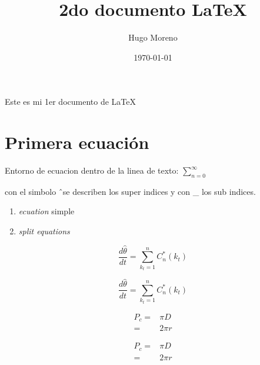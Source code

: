 \documentclass{article}
\title{2do documento \LaTeX}
\author{Hugo Moreno}
\begin{document}
\date{\today}
\maketitle

Este es mi 1er documento de \LaTeX

\section{Primera ecuaci\'on}

Entorno de ecuacion dentro de la linea de texto: $\sum^{\infty}_{n=0}$

con el simbolo \^\  se describen los super indices y con \_ los sub indices.

\begin{enumerate}
\item \emph{ecuation} simple
\item \emph{split equations}
\end{enumerate}

\begin{equation}
\frac{d \hat{\theta}}{dt} = \sum^{n}_{k_{t}=1} C^{*}_{n}(k_{t})
\end{equation}

\begin{equation*}
\frac{d \hat{\theta}}{dt} = \sum^{n}_{k_{t}=1} C^{*}_{n}(k_{t})
\end{equation*}

\begin{equation}
\begin{split}
	P_{c} =& \pi D  \\ 
	=& 2 \pi r
\end{split}
\end{equation}

\begin{subequations}
\begin{align}
	P_{c} =& \pi D  \\ 
	=& 2 \pi r
\end{align}
\end{subequations}
\end{document}
